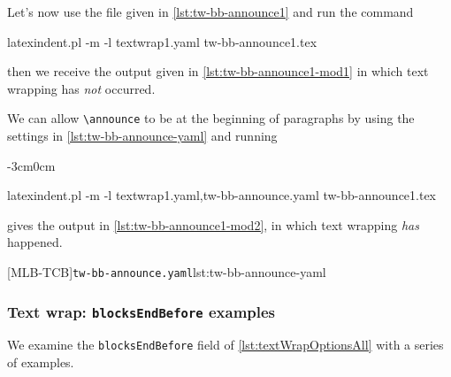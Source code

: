 \documentclass[10pt]{article}
\newenvironment{widepage}{\begin{adjustwidth}{-3cm}{0cm}}{\end{adjustwidth}}
\begin{document}
 \begin{example}
 Let's now use the file given in \cref{lst:tw-bb-announce1}
 and run the command

 \begin{commandshell}
latexindent.pl -m -l textwrap1.yaml tw-bb-announce1.tex
\end{commandshell}

 then we receive the output given in \cref{lst:tw-bb-announce1-mod1} in which text
 wrapping has \emph{not} occurred.


 We can allow \lstinline!\announce! to be at the beginning of paragraphs by using the
 settings in \cref{lst:tw-bb-announce-yaml} and running
 \begin{widepage}

  \begin{commandshell}
latexindent.pl -m -l textwrap1.yaml,tw-bb-announce.yaml tw-bb-announce1.tex
\end{commandshell}

 \end{widepage}
 gives the output in \cref{lst:tw-bb-announce1-mod2}, in which text wrapping \emph{has}
 happened.
 \begin{cmhtcbraster}[raster column skip=.1\linewidth,]
  [MLB-TCB]{\texttt{tw-bb-announce.yaml}}{lst:tw-bb-announce-yaml}
 \end{cmhtcbraster}

 \end{example}

\subsubsection{Text wrap: \texttt{blocksEndBefore} examples}
 We examine the \texttt{blocksEndBefore} field of \cref{lst:textWrapOptionsAll} with a
 series of examples. 
\end{document}
